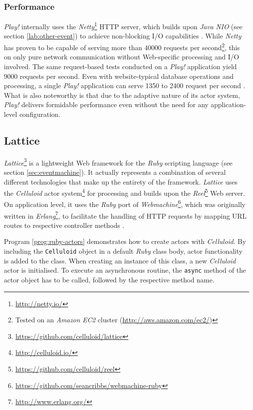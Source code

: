\subsubsection*{Performance}
\textit{Play!} internally uses the \textit{Netty}\footnote{\url{http://netty.io/}} HTTP server, which builds upon \textit{Java NIO} (see section \ref{lab:other-event}) to achieve non-blocking I/O capabilities \cite[p. 52]{Scala}. While \textit{Netty} has proven to be capable of serving more than 40000 requests per second\footnote{Tested on an \textit{Amazon EC2} cluster (\url{http://aws.amazon.com/ec2/})}, this on only pure network communication without Web-specific processing and I/O involved. The same request-based tests conducted on a \textit{Play!} application yield 9000 requests per second. Even with website-typical database operations and processing, a single \textit{Play!} application can serve 1350 to 2400 request per second \cite{Papauschek2013}. What is also noteworthy is that due to the adaptive nature of its actor system, \textit{Play!} delivers formidable performance even without the need for any application-level configuration.

\subsection{Lattice}
\textit{Lattice}\footnote{\url{https://github.com/celluloid/lattice}} is a lightweight Web framework for the \textit{Ruby} scripting language (see section \ref{sec:eventmachine}). It actually represents a combination of several different technologies that make up the entirety of the framework. \textit{Lattice} uses the \textit{Celluloid} actor system\footnote{\url{http://celluloid.io/}} for processing and builds upon the \textit{Reel}\footnote{\url{https://github.com/celluloid/reel}} Web server. On application level, it uses the \textit{Ruby} port of \textit{Webmachine}\footnote{\url{https://github.com/seancribbs/webmachine-ruby}}, which was originally written in \textit{Erlang}\footnote{\url{http://www.erlang.org/}}, to facilitate the handling of HTTP requests by mapping URL routes to respective controller methods \cite{Storimer2013}. 
 
Program \ref{prog:ruby-actors} demonstrates how to create actors with \textit{Celluloid}. By including the \texttt{Celluloid} object in a default \textit{Ruby} class body, actor functionality is added to the class. When creating an instance of this class, a new \textit{Celluloid} actor is initialised. To execute an asynchronous routine, the \texttt{async} method of the actor object has to be called, followed by the respective method name.


